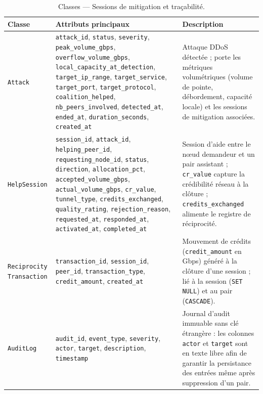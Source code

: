 \begin{table}[H]
\centering
\caption{Classes — Sessions de mitigation et traçabilité.}
\label{tab:classes_sessions}

\renewcommand{\arraystretch}{1.6}
\setlength{\tabcolsep}{5pt}

\begin{tabular}{|
>{\raggedright\arraybackslash}p{3.0cm}|
>{\raggedright\arraybackslash}p{6.2cm}|
>{\raggedright\arraybackslash}p{4.6cm}|}
\hline

\textbf{Classe} &
\textbf{Attributs principaux} &
\textbf{Description} \\
\hline

\texttt{Attack} &
\texttt{attack\_id}, \texttt{status}, \texttt{severity}, \texttt{peak\_volume\_gbps}, \texttt{overflow\_volume\_gbps}, \texttt{local\_capacity\_at\_detection}, \texttt{target\_ip\_range}, \texttt{target\_service}, \texttt{target\_port}, \texttt{target\_protocol}, \texttt{coalition\_helped}, \texttt{nb\_peers\_involved}, \texttt{detected\_at}, \texttt{ended\_at}, \texttt{duration\_seconds}, \texttt{created\_at} &
Attaque DDoS détectée ; porte les métriques volumétriques (volume de pointe, débordement, capacité locale) et les sessions de mitigation associées. \\
\hline

\texttt{HelpSession} &
\texttt{session\_id}, \texttt{attack\_id}, \texttt{helping\_peer\_id}, \texttt{requesting\_node\_id}, \texttt{status}, \texttt{direction}, \texttt{allocation\_pct}, \texttt{accepted\_volume\_gbps}, \texttt{actual\_volume\_gbps}, \texttt{cr\_value}, \texttt{tunnel\_type}, \texttt{credits\_exchanged}, \texttt{quality\_rating}, \texttt{rejection\_reason}, \texttt{requested\_at}, \texttt{responded\_at}, \texttt{activated\_at}, \texttt{completed\_at} &
Session d'aide entre le nœud demandeur et un pair assistant ; \texttt{cr\_value} capture la crédibilité réseau à la clôture ; \texttt{credits\_exchanged} alimente le registre de réciprocité. \\
\hline

\texttt{Reciprocity Transaction} &
\texttt{transaction\_id}, \texttt{session\_id}, \texttt{peer\_id}, \texttt{transaction\_type}, \texttt{credit\_amount}, \texttt{created\_at} &
Mouvement de crédits (\texttt{credit\_amount} en Gbps) généré à la clôture d'une session ; lié à la session (\texttt{SET NULL}) et au pair (\texttt{CASCADE}). \\
\hline

\texttt{AuditLog} &
\texttt{audit\_id}, \texttt{event\_type}, \texttt{severity}, \texttt{actor}, \texttt{target}, \texttt{description}, \texttt{timestamp} &
Journal d'audit immuable sans clé étrangère : les colonnes \texttt{actor} et \texttt{target} sont en texte libre afin de garantir la persistance des entrées même après suppression d'un pair. \\
\hline

\end{tabular}

\end{table}


